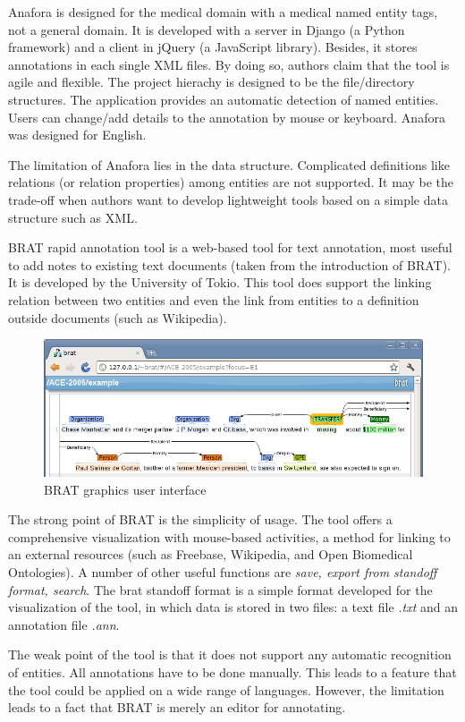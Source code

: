 Anafora is designed for the medical domain with a medical named entity tags, not a general domain.
It is developed with a server in Django (a Python framework) and a client in jQuery (a JavaScript library).
Besides, it stores annotations in each single XML files.
By doing so, authors claim that the tool is agile and flexible.
The project hierachy is designed to be the file/directory structures.
The application provides an automatic detection of named entities.
Users can change/add details to the annotation by mouse or keyboard.
Anafora was designed for English.

The limitation of Anafora lies in the data structure.
Complicated definitions like relations (or relation properties) among entities are not supported.
It may be the trade-off when authors want to develop lightweight tools based on a simple data structure such as XML.



BRAT rapid annotation tool is a web-based tool for text annotation,
most useful to add notes to existing text documents (taken from the introduction of BRAT).
It is developed by the University of Tokio.
This tool does support the linking relation between two entities and even the link from entities to a definition outside documents (such as Wikipedia).

\begin{figure}[!htb]
	\centering
	\includegraphics[width=\textwidth]{Images/brat}
	\caption{BRAT graphics user interface}
	\label{fig:Second}
\end{figure}

The strong point of BRAT is the simplicity of usage.
The tool offers a comprehensive visualization with mouse-based activities,
a method for linking to an external resources (such as Freebase, Wikipedia, and Open Biomedical Ontologies).
A number of other useful functions are \textit{save, export from standoff format, search}.
The brat  standoff format is a simple format developed for the visualization of the tool,
in which data is stored in two files: a text file \textit{.txt} and an annotation file \textit{.ann}.

The weak point of the tool is that it does not support any automatic recognition of entities.
All annotations have to be done manually.
This leads to a feature that the tool could be applied on a wide range of languages.
However, the limitation leads to a fact that BRAT is merely an editor for annotating.
